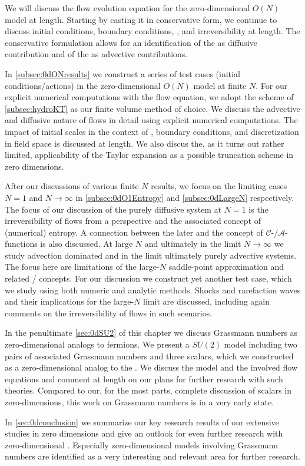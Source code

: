 We will discuss the \frg{} flow evolution equation for the zero-dimensional $O(N)$ model at length.
Starting by casting it in conservative form, we continue to discuss initial conditions, boundary conditions, \rgcy{}, and irreversibility at length.
The conservative formulation allows for an identification of the \sigmaMode{} as diffusive contribution and of the \pionModes{} as advective contributions.

In \cref{subsec:0dONresults} we construct a series of test cases (initial conditions/actions) in the zero-dimensional $O(N)$ model at finite $N$.
For our explicit numerical computations  with the \frg{} flow equation, we adopt the \kt{} scheme of \cref{subsec:hydroKT} as our finite volume method of choice.
We discuss the advective and diffusive nature of \frg{} flows in detail using explicit numerical computations.
The impact of initial scales in the context of \rgcy{}, boundary conditions, and discretization in field space is discussed at length.
We also discus the, as it turns out rather limited, applicability of the \frg{} Taylor expansion as a possible truncation scheme in zero dimensions.

After our discussions of various finite $N$ results, we focus on the limiting cases $N=1$ and $N\rightarrow\infty$ in \cref{subsec:0dO1Entropy} and \cref{subsec:0dLargeN} respectively.
The focus of our discussion of the purely diffusive system at $N=1$ is the irreversibility of \grg{} flows from a \cfd{} perspective and the associated concept of (numerical) entropy.
A connection between the later and the concept of $\mathcal{C}$-/$\mathcal{A}$-functions is also discussed.
At large $N$ and ultimately in the limit $N\rightarrow\infty$ we study advection dominated and in the limit ultimately purely advective systems. 
The focus here are limitations of the large-$N$ saddle-point approximation and related \frg{}/\cfd{} concepts.
For our discussion we construct yet another test case, which we study using both numeric and analytic methods.
Shocks and rarefaction waves and their implications for the large-$N$ limit are discussed, including again comments on the irreversibility of \grg{} flows in such scenarios.\bigskip

In the penultimate \cref{sec:0dSU2} of this chapter we discuss Grassmann numbers as zero-dimensional analogs to fermions.
We present a $SU(2)$ model including two pairs of associated Grassmann numbers and three scalars, which we constructed as a zero-dimensional analog to the \qmm{}.
We discuss the model and the involved flow equations and comment at length on our plans for further research with such theories.
Compared to our, for the most parts, complete discussion of scalars in zero-dimensions, this work on Grassmann numbers is in a very early state.\bigskip

In \cref{sec:0dconclusion} we summarize our key research results of our extensive studies in zero dimensions and give an outlook for even further research with zero-dimensional \qfts{}.
Especially zero-dimensional models involving Grassmann numbers are identified as a very interesting and relevant area for further research.